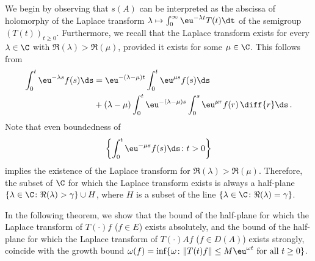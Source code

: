 We begin by observing that $s(A)$ can be interpreted as the abscissa of holomorphy of the Laplace transform $\lambda \mapsto \int_{0}^{\infty} \eu^{-\lambda t} T(t)  \dt$ of the semigroup $(T(t))_{t \geq 0}$.
Furthermore, we recall that the Laplace transform exists for every $\lambda \in \C$ with $\Re(\lambda) > \Re(\mu)$, provided it exists for some $\mu\in\C$.
This follows from 
\begin{equation}\label{eq:a4-1.1}
\begin{split}
\int_0^t \eu^{-\lambda s} f(s) \ds &= \eu^{-(\lambda-\mu)t} \int_{0}^{t} \eu^{\mu s} f(s)  \ds \\ 
&+ (\lambda - \mu) \int_{0}^{t} \eu^{-(\lambda-\mu)s} \int_{0}^{s} \eu^{\mu r} f(r) \,\diff{r} \ds \,. 
\end{split}
\end{equation}
Note that even boundedness of 
\[
\left\{ \int_{0}^{t} \eu^{-\mu s}f(s)  \ds \colon t > 0\right\}
\]
implies the existence of the Laplace transform for $\Re(\lambda) > \Re(\mu)$. 
Therefore, the subset of\/ $\C$ for which the Laplace transform exists is always a half-plane 
$\{\lambda \in \C\colon\Re(\lambda)\allowbreak > \gamma\} \cup H$, where $H$ is a subset of the line $\{\lambda \in \C\colon\Re(\lambda) = \gamma\}$.

In the following theorem, we show that the bound of the half-plane for which the Laplace transform of\/ $T(\cdot)f$ ($f \in E$) exists absolutely, and the bound of the half-plane for which the Laplace transform of\/ $T(\cdot)Af$ ($f \in D(A)$) exists strongly, coincide with the growth bound $\omega(f) = \inf\{\omega\colon\|T(t)f\| \leq M\eu^{\omega t} \text{ for all } t \geq 0\}$.

